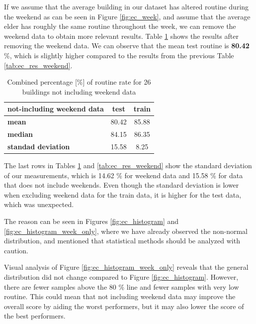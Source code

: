 If we assume that the average building in our dataset has altered routine during the weekend as can be seen in Figure \ref{fig:ec_week},
and assume that the average elder has roughly the same routine throughout the week, we can remove the weekend data
to obtain more relevant results.
Table \ref{tab:ec_res_no_weekend} shows the results after removing the weekend data.
We can observe that the mean test routine is \textbf{80.42} \%, which is slightly higher compared to the results from the previous Table \ref{tab:ec_res_weekend}.

\begin{table}[htbp]
    \centering
    \caption{Combined percentage [\%] of routine rate for 26 buildings not including weekend data}
    \label{tab:ec_res_no_weekend}
    \begin{tabular}{lcc}
        \hline
        \textbf{not-including weekend data} & \textbf{test} & \textbf{train} \\
        \hline
        \textbf{mean} & 80.42 & 85.88 \\
        \textbf{median} & 84.15 & 86.35 \\
        \textbf{standad deviation} & 15.58 & 8.25 \\
        \hline
        \end{tabular}
\end{table}

The last rows in Tables \ref{tab:ec_res_no_weekend} and \ref{tab:ec_res_weekend} show the standard deviation of our measurements,
which is 14.62 \% for weekend data and 15.58 \% for data that does not include weekends.
Even though the standard deviation is lower when excluding weekend data for the train data, it is higher for the test data, which was unexpected.

The reason can be seen in Figures \ref{fig:ec_histogram} and \ref{fig:ec_histogram_week_only},
where we have already observed the non-normal distribution, and mentioned that statistical methods should be analyzed with caution.

Visual analysis of Figure \ref{fig:ec_histogram_week_only} reveals that the general distribution did not change compared to Figure \ref{fig:ec_histogram}.
However, there are fewer samples above the 80 \% line and fewer samples with very low routine.
This could mean that not including weekend data may improve the overall score by aiding the worst performers, but it may also lower the score of the best performers.

